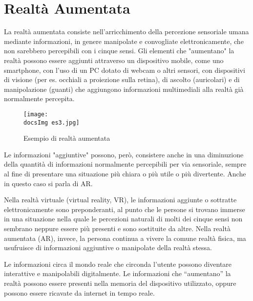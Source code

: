 \section{Realt\`a Aumentata}
La realtà aumentata consiste nell'arricchimento della percezione sensoriale umana mediante informazioni, in genere manipolate e convogliate elettronicamente, che non sarebbero percepibili con i cinque sensi.
Gli elementi che "aumentano" la realtà possono essere aggiunti attraverso un dispositivo mobile, come uno smartphone, con l'uso di un PC dotato di webcam o altri sensori, con dispositivi di visione (per es. occhiali a proiezione sulla retina), di ascolto (auricolari) e di manipolazione (guanti) che aggiungono informazioni multimediali alla realtà già normalmente percepita.

\begin{figure}[H]
	\centering
	\texttt{[image: \\docsImg es3.jpg]}
	\caption{Esempio di realt\`a aumentata}
	\label{fig:Esempio di realta' aumentata presente nell'app Experenti - Motore}
\end{figure}

Le informazioni "aggiuntive" possono, per\`o, consistere anche in una diminuzione della quantità di informazioni normalmente percepibili per via sensoriale, sempre al fine di presentare una situazione più chiara o più utile o più divertente. Anche in questo caso si parla di AR.

Nella realtà virtuale (virtual reality, VR), le informazioni aggiunte o sottratte elettronicamente sono preponderanti, al punto che le persone si trovano immerse in una situazione nella quale le percezioni naturali di molti dei cinque sensi non sembrano neppure essere più presenti e sono sostituite da altre. Nella realtà aumentata (AR), invece, la persona continua a vivere la comune realtà fisica, ma usufruisce di informazioni aggiuntive o manipolate della realtà stessa.

Le informazioni circa il mondo reale che circonda l'utente possono diventare interattive e manipolabili digitalmente.
Le informazioni che “aumentano” la realtà possono essere presenti nella memoria del dispositivo utilizzato, oppure possono essere ricavate da internet in tempo reale.

